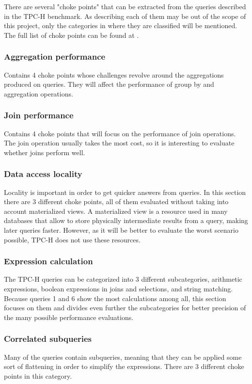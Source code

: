 \documentclass[conference]{IEEEtran}
\begin{document}
There are several "choke points" that can be extracted from the queries described in the TPC-H benchmark. As describing each of them may be out of the scope of this project, only the categories in where they are classified will be mentioned. The full list of choke points can be found at \cite{boncz-2014}.

\subsubsection{Aggregation performance}
Contains 4 choke points whose challenges revolve around the aggregations produced on queries. They will affect the performance of group by and aggregation operations.

\subsubsection{Join performance}
Contains 4 choke points that will focus on the performance of join operations. The join operation usually takes the most cost, so it is interesting to evaluate whether joins perform well.

\subsubsection{Data access locality}
Locality is important in order to get quicker answers from queries. In this section there are 3 different choke points, all of them evaluated without taking into account materialized views. A materialized view is a resource used in many databases that allow to store physically intermediate results from a query, making later queries faster. However, as it will be better to evaluate the worst scenario possible, TPC-H does not use these resources.

\subsubsection{Expression calculation}
The TPC-H queries can be categorized into 3 different subcategories, arithmetic expressions, boolean expressions in joins and selections, and string matching. Because queries 1 and 6 show the most calculations among all, this section focuses on them and divides even further the subcategories for better precision of the many possible performance evaluations.

\subsubsection{Correlated subqueries}
Many of the queries contain subqueries, meaning that they can be applied some sort of flattening in order to simplify the expressions. There are 3 different choke points in this category.
\end{document}
